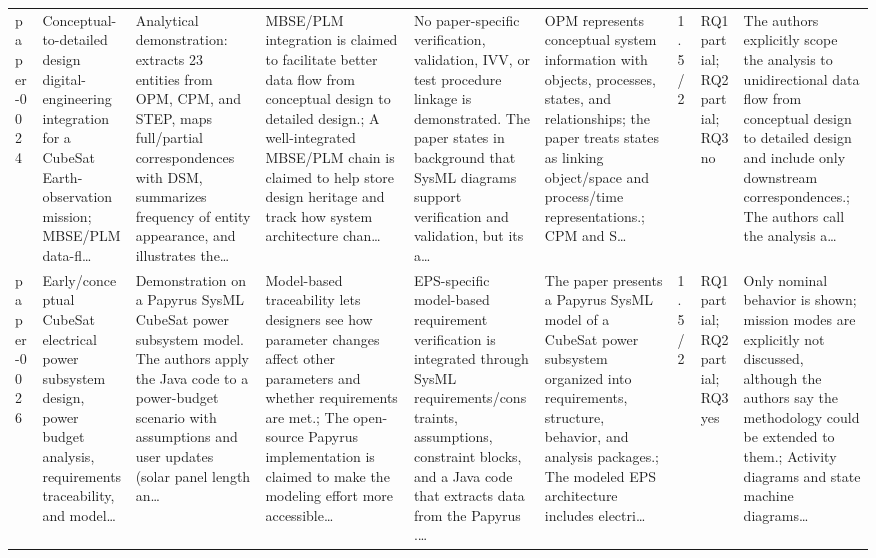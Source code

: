 \documentclass[10pt]{article}
\begin{document}
\begin{landscape}
\begin{longtable}{p{1.0cm}p{2.4cm}p{3.1cm}p{3.7cm}p{3.4cm}p{3.1cm}p{1.0cm}p{1.8cm}p{3.4cm}}
paper-0024 & Conceptual-to-detailed design digital-engineering integration for a CubeSat Earth-observation mission; MBSE/PLM data-fl… & Analytical demonstration: extracts 23 entities from OPM, CPM, and STEP, maps full/partial correspondences with DSM, summarizes frequency of entity appearance, and illustrates the… & MBSE/PLM integration is claimed to facilitate better data flow from conceptual design to detailed design.; A well-integrated MBSE/PLM chain is claimed to help store design heritage and track how system architecture chan… & No paper-specific verification, validation, IVV, or test procedure linkage is demonstrated. The paper states in background that SysML diagrams support verification and validation, but its a… & OPM represents conceptual system information with objects, processes, states, and relationships; the paper treats states as linking object/space and process/time representations.; CPM and S… & 1.5/2 & RQ1 partial; RQ2 partial; RQ3 no & The authors explicitly scope the analysis to unidirectional data flow from conceptual design to detailed design and include only downstream correspondences.; The authors call the analysis a… \\
paper-0026 & Early/conceptual CubeSat electrical power subsystem design, power budget analysis, requirements traceability, and model… & Demonstration on a Papyrus SysML CubeSat power subsystem model. The authors apply the Java code to a power-budget scenario with assumptions and user updates (solar panel length an… & Model-based traceability lets designers see how parameter changes affect other parameters and whether requirements are met.; The open-source Papyrus implementation is claimed to make the modeling effort more accessible… & EPS-specific model-based requirement verification is integrated through SysML requirements/constraints, assumptions, constraint blocks, and a Java code that extracts data from the Papyrus .… & The paper presents a Papyrus SysML model of a CubeSat power subsystem organized into requirements, structure, behavior, and analysis packages.; The modeled EPS architecture includes electri… & 1.5/2 & RQ1 partial; RQ2 partial; RQ3 yes & Only nominal behavior is shown; mission modes are explicitly not discussed, although the authors say the methodology could be extended to them.; Activity diagrams and state machine diagrams… \\

\end{longtable}
\end{landscape}
\end{document}
